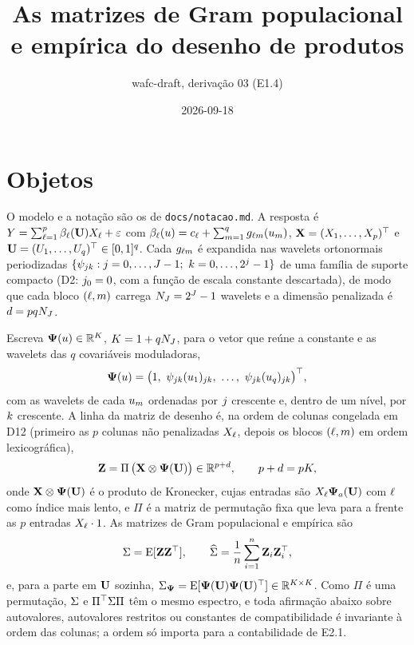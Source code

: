 \documentclass[11pt]{article}
\title{As matrizes de Gram populacional e empírica do desenho de produtos}
\author{wafc-draft, derivação 03 (E1.4)}
\date{2026-09-18}
\newcommand{\bPsi}{\boldsymbol{\Psi}}
\newcommand{\kron}{\otimes}
\begin{document}
\maketitle

\section*{Objetos}

O modelo e a notação são os de \texttt{docs/notacao.md}. A resposta é
$Y = \sum_{\ell=1}^{p} \beta_{\ell}(\mathbf{U}) X_{\ell} + \varepsilon$ com
$\beta_{\ell}(u) = c_{\ell} + \sum_{m=1}^{q} g_{\ell m}(u_{m})$, $\mathbf{X} = (X_1, \ldots, X_p)^{\top}$
e $\mathbf{U} = (U_1, \ldots, U_q)^{\top} \in [0,1]^q$. Cada $g_{\ell m}$ é expandida nas wavelets
ortonormais periodizadas $\{\psi_{jk} : j = 0, \ldots, J-1;\ k = 0, \ldots, 2^{j}-1\}$ de uma
família de suporte compacto (D2: $j_{0} = 0$, com a função de escala constante descartada), de modo que cada
bloco $(\ell, m)$ carrega $N_{J} = 2^J - 1$ wavelets e a dimensão penalizada é $d = p q N_{J}$.

Escreva $\bPsi(u) \in \R^{K}$, $K = 1 + qN_{J}$, para o vetor que reúne a constante e as wavelets
das $q$ covariáveis moduladoras,
\[
    \bPsi(u) = \bigl(1,\ \wav{\lev}{\tsl}(u_1)_{\lev\tsl},\ \ldots,\ \wav{\lev}{\tsl}(u_q)_{\lev\tsl}\bigr)\T ,
\]
com as wavelets de cada $u_{m}$ ordenadas por $j$ crescente e, dentro de um nível, por $k$ crescente.
A linha da matriz de desenho é, na ordem de colunas congelada em D12 (primeiro as $p$ colunas não penalizadas
$X_{\ell}$, depois os blocos $(\ell, m)$ em ordem lexicográfica),
\[
    \bZ = \Pi\,\bigl(\bX \kron \bPsi(\bU)\bigr) \in \R^{p + d}, \qquad p + d = pK,
\]
onde $\bX \kron \bPsi(\bU)$ é o produto de Kronecker, cujas entradas são $X_{\cv}\bPsi_a(\bU)$ com
$\ell$ como índice mais lento, e $\Pi$ é a matriz de permutação fixa que leva para a frente as $p$ entradas
$X_{\ell}\cdot 1$. As matrizes de Gram populacional e empírica são
\[
    \Sigma = \mathrm{E}[\mathbf{Z}\mathbf{Z}^{\top}], \qquad \widehat{\Sigma} = \frac1n \sum_{i=1}^{n} \mathbf{Z}_i\mathbf{Z}_i^{\top} ,
\]
e, para a parte em $\mathbf{U}$ sozinha, $\Gram_{\bPsi} = \E[\bPsi(\bU)\bPsi(\bU)\T] \in \R^{K \times K}$.
Como $\Pi$ é uma permutação, $\Sigma$ e $\Pi^{\top}\Sigma\Pi$ têm o mesmo espectro, e toda afirmação abaixo
sobre autovalores, autovalores restritos ou constantes de compatibilidade é invariante à ordem das
colunas; a ordem só importa para a contabilidade de E2.1.
\end{document}
